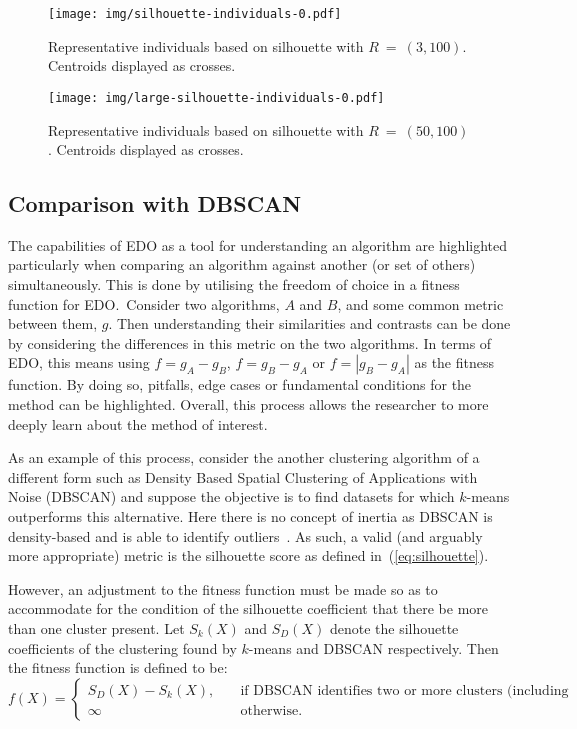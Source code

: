 \begin{figure}[htbp]
    \ContinuedFloat*
    \centering
    \texttt{[image: img/silhouette-individuals-0.pdf]}
    \caption{Representative individuals based on silhouette with
             \(R~=~(3,100)\). Centroids displayed as
             crosses.}\label{figure:silhouette-individuals}
\end{figure}

\begin{figure}[htbp]
    \ContinuedFloat%
    \centering
    \texttt{[image: img/large-silhouette-individuals-0.pdf]}
    \caption{Representative individuals based on silhouette with
             \(R~=~(50,100)\). Centroids displayed as
             crosses.}\label{figure:large-silhouette-individuals}
\end{figure}


\subsection{Comparison with DBSCAN}

The capabilities of EDO as a tool for understanding an algorithm are highlighted
particularly when comparing an algorithm against another (or set of others)
simultaneously. This is done by utilising the freedom of choice in a fitness
function for EDO.\ Consider two algorithms, \(A\) and \(B\), and some common
metric between them, \(g\). Then understanding their similarities and contrasts
can be done by considering the differences in this metric on the two algorithms.
In terms of EDO, this means using \(f = g_A - g_B\), \(f = g_B - g_A\) or \(f
= \left| g_B - g_A \right|\) as the fitness function. By doing so, pitfalls,
edge cases or fundamental conditions for the method can be highlighted.
Overall, this process allows the researcher to more deeply learn about the
method of interest.

As an example of this process, consider the another clustering algorithm of a
different form such as Density Based Spatial Clustering of Applications with
Noise (DBSCAN) and suppose the objective is to find datasets for which
\(k\)-means outperforms this alternative. Here there is no concept of inertia as
DBSCAN is density-based and is able to identify outliers~\cite{Ester1996}. As
such, a valid (and arguably more appropriate) metric is the silhouette score as
defined in~(\ref{eq:silhouette}).

However, an adjustment to the fitness function must be made so as to accommodate
for the condition of the silhouette coefficient that there be more than one
cluster present. Let \(S_k (X)\) and \(S_D (X)\) denote the silhouette
coefficients of the clustering found by \(k\)-means and DBSCAN respectively.
Then the fitness function is defined to be:
\begin{equation}
    f(X) = 
        \begin{cases}
            S_D (X) - S_k (X), &\quad \text{if DBSCAN identifies two or more
            clusters (including noise)}\\
            \infty &\quad \text{otherwise.}
        \end{cases}\label{equation:dbscan-fitness}
\end{equation}

